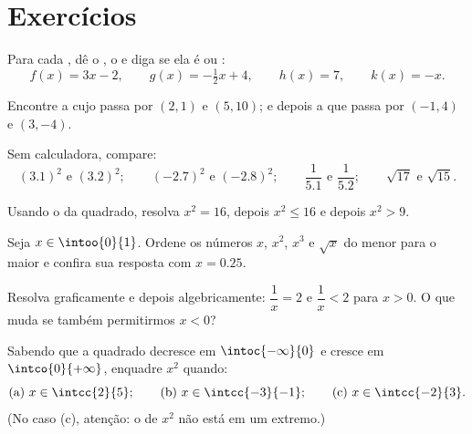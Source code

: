 \section{Exercícios}

\begin{exercise}[$\star$]\label{exo:g10:reffunc:1}
Para cada , dê o , o  e
diga se ela é  ou :
\[
f(x) = 3x - 2, \qquad
g(x) = -\tfrac12 x + 4, \qquad
h(x) = 7, \qquad
k(x) = -x .
\]
\end{exercise}

\begin{exercise}[$\star$]\label{exo:g10:reffunc:2}
Encontre a  cujo  passa por $(2, 1)$ e $(5, 10)$; e
depois a que passa por $(-1, 4)$ e $(3, -4)$.
\end{exercise}

\begin{exercise}[$\star$]\label{exo:g10:reffunc:3}
Sem calculadora, compare:
\[
(3.1)^2 \text{ e } (3.2)^2; \qquad
(-2.7)^2 \text{ e } (-2.8)^2; \qquad
\frac{1}{5.1} \text{ e } \frac{1}{5.2}; \qquad
\sqrt{17} \text{ e } \sqrt{15}.
\]
\end{exercise}

\begin{exercise}[$\star$]\label{exo:g10:reffunc:4}
Usando o  da  quadrado, resolva $x^2 = 16$, depois
$x^2 \leq 16$ e depois $x^2 > 9$.
\end{exercise}

\begin{exercise}[$\star$]\label{exo:g10:reffunc:5}
Seja $x \in \intoo{0}{1}$. Ordene os números $x$, $x^2$, $x^3$ e
$\sqrt x$ do menor para o maior e confira sua resposta com $x = 0.25$.
\end{exercise}

\begin{exercise}[$\star\star$]\label{exo:g10:reffunc:6}
Resolva graficamente e depois algebricamente: $\dfrac1x = 2$ e
$\dfrac1x < 2$ para $x > 0$. O que muda se também permitirmos $x < 0$?
\end{exercise}

\begin{exercise}[$\star\star$]\label{exo:g10:reffunc:7}
Sabendo que a  quadrado decresce em $\intoc{-\infty}{0}$ e cresce
em $\intco{0}{+\infty}$, enquadre $x^2$ quando:
\[
\text{(a) } x \in \intcc{2}{5};
\qquad
\text{(b) } x \in \intcc{-3}{-1};
\qquad
\text{(c) } x \in \intcc{-2}{3}.
\]
(No caso (c), atenção: o  de $x^2$ não está em um extremo.)
\end{exercise}


